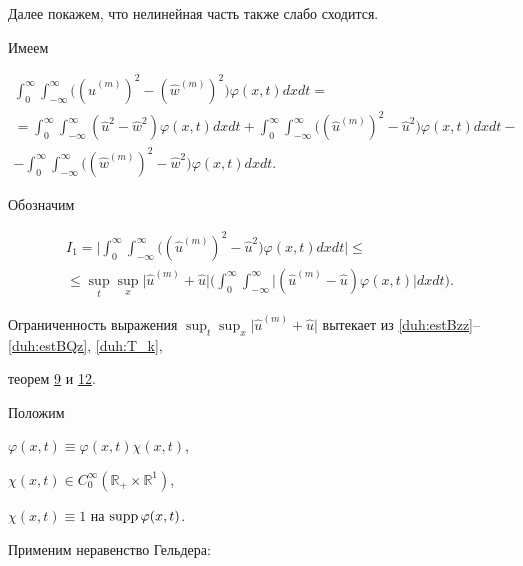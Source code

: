 Далее покажем, что нелинейная часть также слабо сходится. 

Имеем

\begin{multline}

\int_0^\infty \int_{-\infty}^\infty \bigl((\widehat{u}^{(m)})^2- (\widehat{w}^{(m)})^2\bigr)\varphi(x,t) dxdt=

\\

=\int_0^\infty \int_{-\infty}^\infty (\widehat{u}^2- \widehat{w}^2)\varphi(x,t) dxdt+

\int_0^\infty \int_{-\infty}^\infty \bigl((\widehat{u}^{(m)})^2- \widehat{u}^2 \bigr)\varphi(x,t) dxdt-

\\

-\int_0^\infty \int_{-\infty}^\infty \bigl((\widehat{w}^{(m)})^2- \widehat{w}^2\bigr)\varphi(x,t) dxdt.

\label{duh:weakconvergence}

\end{multline}

Обозначим

\begin{multline*}

I_1=\biggl|\int_0^\infty \int_{-\infty}^\infty 

\bigl((\widehat{u}^{(m)})^2- \widehat{u}^2\bigr)\varphi(x,t) dxdt \biggr|\le

\\

\le \sup_{t}\sup_{x} \bigl|\widehat{u}^{(m)}+ \widehat{u} \bigr| \biggl(

\int_0^\infty \int_{-\infty}^\infty \bigl|(\widehat{u}^{(m)}- \widehat{u})\varphi(x,t)\bigr| dxdt \biggr).

\end{multline*}

Ограниченность выражения $\sup_{t}\sup_{x}\bigl|\widehat{u}^{(m)}+ \widehat{u}\bigr|$ вытекает из \eqref{duh:estBzz}--\eqref{duh:estBQz}, \eqref{duh:T_k}, 

теорем \hyperlink{dukh:th:9}{9} и \hyperlink{dukh:th:12}{12}. 

Положим 

$\varphi(x,t)\equiv\varphi(x,t) \chi(x,t)$,

$\chi(x,t)\in C_0^\infty(\mathbb R_{+}\times \mathbb R^1)$, 

$\chi(x,t)\equiv1 $ на $\mathop{\rm supp}\nolimits \varphi(x,t)$. 

Применим неравенство Гельдера:

